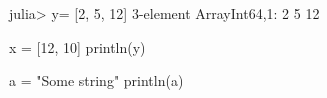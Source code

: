 

\begin{juliaterm}
julia> y= [2, 5, 12]
3-element Array{Int64,1}:
  2
  5
 12

\end{juliaterm}



\begin{juliacode}
x = [12, 10]
println(y)
\end{juliacode}
\begin{juliaout}
[2,5,12]
\end{juliaout}




\begin{juliaout}
[12,10]
\end{juliaout}







\begin{juliacode}
a = "Some string"
println(a)
\end{juliacode}




